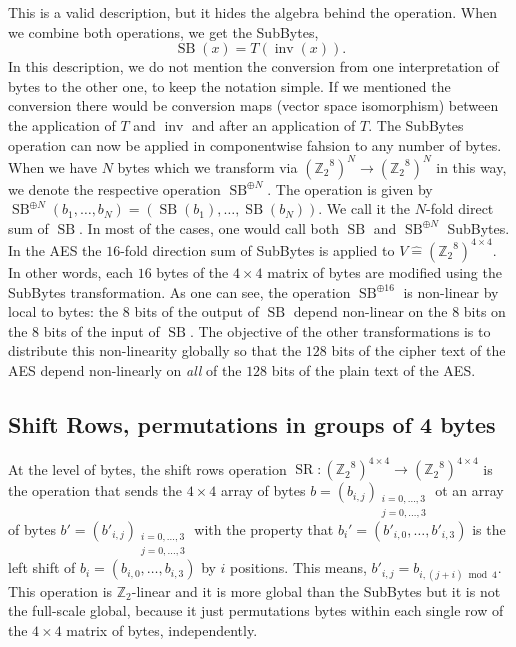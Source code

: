 \documentclass[11pt,a4paper]{amsart}
\newcommand{\SB}{\operatorname{SB}}
\newcommand{\SR}{\operatorname{SR}}
\newcommand{\Z}{\mathbb{Z}}
\newcommand{\inv}{\operatorname{inv}}
\begin{document}
This is a valid description, but it hides the algebra behind the operation. When we combine both operations, we get the SubBytes, 
\[
	\SB(x) = T( \inv(x)).
\] In this description, we do not mention the conversion from one interpretation of bytes to the other one, to keep the notation simple. If we mentioned the conversion there would be conversion maps (vector space isomorphism) between the application of $T$ and $\inv$ and after an application of $T$. 
The SubBytes operation can now be applied in componentwise fahsion to any number of bytes. When we have $N$ bytes which we transform via $({\Z_2}^8)^N \to ({\Z_2}^8)^N$ in this way, we denote the respective operation $\SB^{\oplus N}$. The operation is given by $\SB^{\oplus N} (b_1,\ldots,b_N) = ( \SB(b_1),\ldots, \SB(b_N))$. We call it the $N$-fold direct sum of $\SB$. In most of the cases, one would call both $\SB$ and $\SB^{\oplus N}$ SubBytes. In the AES the $16$-fold direction sum of SubBytes is applied to $V \hat{=} ( {\Z_2}^8)^{4 \times 4}$. In other words, each $16$ bytes of the $4 \times 4$ matrix of bytes are modified using the SubBytes transformation. As one can see, the operation $\SB^{\oplus 16}$ is non-linear by local to bytes: the $8$  bits of the output of $\SB$ depend non-linear on the $8$ bits  on the $8$ bits of the input of $\SB$. The objective of the other transformations is to distribute this non-linearity globally so that the $128$ bits of the cipher text of the AES depend non-linearly on \emph{all} of the $128$ bits of the plain text of the AES. 

\subsection*{Shift Rows, permutations in groups of 4 bytes}
At the level of bytes, the shift rows operation  $\SR : ({\Z_2}^8)^{4 \times 4} \to ({\Z_2}^8)^{4 \times 4}$ is the operation that sends the $4 \times 4$ array of bytes $b = (b_{i,j} )_{\substack{i = 0,\ldots,3 \\ j= 0,\ldots,3 }} $ ot an array of bytes $b'= (b'_{i,j} )_{\substack{i = 0,\ldots,3 \\ j= 0,\ldots,3 }} $ with the property that $b_i' = (b'_{i,0},\ldots, b'_{i,3})$ is the left shift of $b_i = (b_{i,0},\ldots,b_{i,3})$ by $i$ positions. This means, $b'_{i,j} = b_{i,(j+i) \bmod 4}$. This operation is $\Z_2$-linear and it is more global than the SubBytes but it is not the full-scale global, because it just permutations bytes within each single row of the $4 \times 4$ matrix of bytes, independently. 
\end{document}
